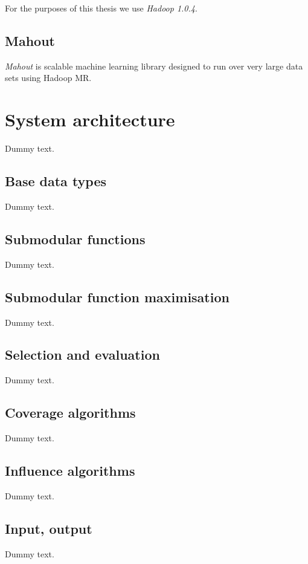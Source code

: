 For the purposes of this thesis we use \emph{Hadoop 1.0.4}.

\subsection{Mahout}

\emph{Mahout} is scalable machine learning library designed to run over very large data sets using Hadoop \acl{MR}.


\section{System architecture}

Dummy text.

\subsection{Base data types}

Dummy text.

\subsection{Submodular functions}

Dummy text.

\subsection{Submodular function maximisation}

Dummy text.

\subsection{Selection and evaluation}

Dummy text.

\subsection{Coverage algorithms}

Dummy text.

\subsection{Influence algorithms}

Dummy text.

\subsection{Input, output}

Dummy text.

